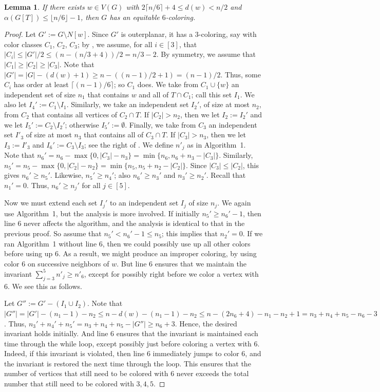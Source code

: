 \documentclass[11pt]{article}
\newtheorem{lem}{Lemma}
\theoremstyle{definition}
\newcommand\floor[1]{\lfloor#1\rfloor}
\newcommand\ceil[1]{\lceil#1\rceil}
\renewcommand\ge\geqslant
\renewcommand\le\leqslant
\begin{document}
\begin{lem}
	If there exists $w\in V(G)$ with $2\ceil{n/6}+4\le d(w)< n/2$ and $\alpha(G[T])\le \floor{n/6}-1$, then $G$ has an equitable $6$-coloring.
	\label{alg1-lem2}
\end{lem}
\begin{proof}
	Let $G':=G\setminus N[w]$.  Since $G'$ is outerplanar, it has a $3$-coloring, say with color classes $C_1$, $C_2$, $C_3$; by ,
	we assume, for all $i\in[3]$, that $|C_i|\le |G'|/2 \le (n - (n/3+4))/2 = n/3-2$.  By symmetry, we assume that $|C_1|\ge |C_2|\ge |C_3|$.
	Note that $|G'|=|G|-(d(w)+1)\ge n-((n-1)/2+1) = (n-1)/2$.  Thus, some $C_i$ has order at least $\ceil{(n-1)/6}$; so $C_1$ does.  
	We take from $C_1\cup\{w\}$ an independent set of size $n_1$ that contains $w$ and all of $T\cap C_1$; call this set $I_1$.  
	We also let $I_4':=C_1\setminus I_1$.
	Similarly, we take an independent set $I_2'$, of size at most $n_2$, from $C_2$ that contains all vertices of $C_2\cap T$.
	If $|C_2|>n_2$, then we let $I_2:=I_2'$ and we let $I_5':=C_2\setminus I_2'$; otherwise $I_5':=\emptyset$.
	Finally, we take from $C_3$ an independent set $I'_3$ of size at most $n_3$ that contains all of $C_3\cap T$.  If $|C_3|> 
	n_3$, then we let $I_3:=I'_3$ and $I_6':=C_3\setminus I_3$; see the right of .  We define $n'_j$ as in Algorithm~1. 
	Note that $n_6' = n_6 - \max\{0,|C_3|-n_3\} = \min\{n_6,n_6+n_3-|C_3|\}$.
	Similarly, $n_5' = n_5 - \max\{0,|C_2|-n_2\} = \min\{n_5,n_5+n_2-|C_2|\}$.  Since $|C_3|\le |C_2|$, this gives $n_6'\ge n_5'$.
	Likewise, $n_5'\ge n_4'$; also $n_6'\ge n_3'$ and $n_3'\ge n_2'$.  Recall that $n_1'=0$.  Thus, $n_6'\ge n_j'$ for all $j\in[5]$.

	Now we must extend each set $I_j'$ to an independent set $I_j$ of size $n_j$.  
	We again use Algorithm~1, but the analysis is more involved.  If initially $n_5'\ge n_6'-1$, then line 6 never affects the algorithm, and 
	the analysis is identical to that in the previous proof.  So assume that $n_5' <n_6'-1\le n_5$; this implies that $n_2'=0$.  If we ran Algorithm~1 
	without line 6, then we could possibly use up all other colors before using up 6.  As a result, we might produce an improper coloring, by using 
	color $6$ on successive neighbors of $w$.  But line $6$ ensures that we maintain the invariant $\sum_{j=3}^5n'_j\ge n'_6$, except for possibly 
	right before we color a vertex with $6$.  We see this as follows.  

	Let $G'':=G'-(I_1\cup I_2)$.  Note that $|G''| = |G'|-(n_1-1)-n_2 \le n - d(w) - (n_1-1)-n_2 \le n - (2n_6+4)-n_1-n_2 +1 = n_3+n_4+n_5 - n_6-3$.
	Thus, $n_3'+n_4'+n_5' = n_3+n_4+n_5 - |G''| \ge n_6 + 3$.  Hence, the desired invariant holds initially.  And line 6 ensures that the invariant
	is maintained each time through the while loop, except possibly just before coloring a vertex with $6$.  Indeed, if this invariant is violated,
	then line 6 immediately jumps to color $6$, and the invariant is restored the next time through the loop.  This ensures that the number of vertices
	that still need to be colored with $6$ never exceeds the total number that still need to be colored with $3,4,5$.  


\end{proof}
\end{document}
